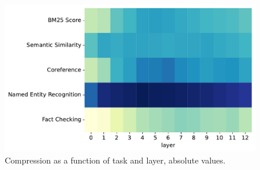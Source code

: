 \begin{figure}
    \centering
    \includegraphics[width=\textwidth]{gfx/probing/abs_heatmap_compression}
    \caption{Compression as a function of task and layer, absolute values.}
\end{figure}
